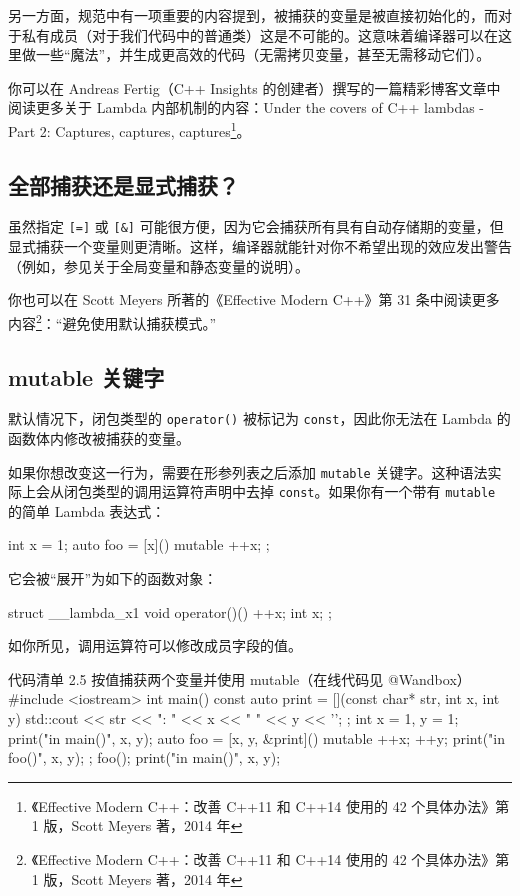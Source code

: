 \begin{codebox}
另一方面，规范中有一项重要的内容提到，被捕获的变量是被直接初始化的，而对于私有成员（对于我们代码中的普通类）这是不可能的。这意味着编译器可以在这里做一些“魔法”，并生成更高效的代码（无需拷贝变量，甚至无需移动它们）。

你可以在 Andreas Fertig（C++ Insights 的创建者）撰写的一篇精彩博客文章中阅读更多关于 Lambda 内部机制的内容：Under the covers of C++ lambdas - Part 2: Captures, captures, captures\footnote{《Effective Modern C++：改善 C++11 和 C++14 使用的 42 个具体办法》第 1 版，Scott Meyers 著，2014 年}。

\subsection{全部捕获还是显式捕获？}

虽然指定 \texttt{[=]} 或 \texttt{[\&]} 可能很方便，因为它会捕获所有具有自动存储期的变量，但显式捕获一个变量则更清晰。这样，编译器就能针对你不希望出现的效应发出警告（例如，参见关于全局变量和静态变量的说明）。

你也可以在 Scott Meyers 所著的《Effective Modern C++》第 31 条中阅读更多内容\footnote{《Effective Modern C++：改善 C++11 和 C++14 使用的 42 个具体办法》第 1 版，Scott Meyers 著，2014 年}：“避免使用默认捕获模式。”

\subsection{mutable 关键字}

默认情况下，闭包类型的 \texttt{operator()} 被标记为 \texttt{const}，因此你无法在 Lambda 的函数体内修改被捕获的变量。

如果你想改变这一行为，需要在形参列表之后添加 \texttt{mutable} 关键字。这种语法实际上会从闭包类型的调用运算符声明中去掉 \texttt{const}。如果你有一个带有 \texttt{mutable} 的简单 Lambda 表达式：

\begin{codebox}
int x = 1;
auto foo = [x]() mutable { ++x; };
\end{codebox}

它会被“展开”为如下的函数对象：

\begin{codebox}
struct __lambda_x1 {
void operator()() { ++x; }
int x;
};
\end{codebox}

如你所见，调用运算符可以修改成员字段的值。

\begin{codeboxt}{代码清单 2.5 按值捕获两个变量并使用 mutable（在线代码见 @Wandbox）}
#include <iostream>
int main() {
const auto print = [](const char* str, int x, int y) {
std::cout << str << ": " << x << " " << y << '\n';
};
int x = 1, y = 1;
print("in main()", x, y);
auto foo = [x, y, &print]() mutable {
++x;
++y;
print("in foo()", x, y);
};
foo();
print("in main()", x, y);
}
\end{codeboxt}


\end{codebox}
